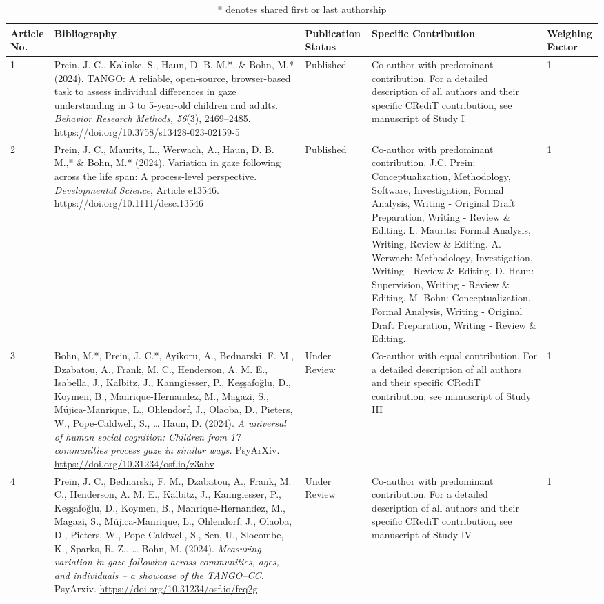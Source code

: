 \documentclass[
]{scrbook}
\begin{document}
\begin{table}[H]
\centering
\footnotesize
\begin{tabular}{p{8mm}p{55mm}p{18mm}p{48mm}p{9mm}}\toprule
Article No. & Bibliography & Publication Status & Specific Contribution & Weighing Factor \\
\midrule
1 & Prein, J. C., Kalinke, S., Haun, D. B. M.*, \& Bohn, M.* (2024). TANGO: A reliable, open-source, browser-based task to assess individual differences in gaze understanding in 3 to 5-year-old children and adults. \textit{Behavior Research Methods, 56}(3), 2469–2485. \url{https://doi.org/10.3758/s13428-023-02159-5} & Published & Co-author with predominant contribution. For a detailed description of all authors and their specific CRediT contribution, see manuscript of Study I & 1 \\
2 & Prein, J. C., Maurits, L., Werwach, A., Haun, D. B. M.,* \& Bohn, M.* (2024). Variation in gaze following across the life span: A process-level perspective. \textit{Developmental Science}, Article e13546. \url{https://doi.org/10.1111/desc.13546} & Published & Co-author with predominant contribution. J.C. Prein: Conceptualization, Methodology, Software, Investigation, Formal Analysis, Writing - Original Draft Preparation, Writing - Review \& Editing. L. Maurits: Formal Analysis, Writing, Review \& Editing. A. Werwach: Methodology, Investigation, Writing - Review \& Editing. D. Haun: Supervision, Writing - Review \& Editing. M. Bohn: Conceptualization, Formal Analysis, Writing - Original Draft Preparation, Writing - Review \& Editing. & 1 \\
3 & Bohn, M.*, Prein, J. C.*, Ayikoru, A., Bednarski, F. M., Dzabatou, A., Frank, M. C., Henderson, A. M. E., Isabella, J., Kalbitz, J., Kanngiesser, P., Keşşafoğlu, D., Koymen, B., Manrique-Hernandez, M., Magazi, S., Mújica-Manrique, L., Ohlendorf, J., Olaoba, D., Pieters, W., Pope-Caldwell, S., … Haun, D. (2024). \textit{A universal of human social cognition: Children from 17 communities process gaze in similar ways.} PsyArXiv. \url{https://doi.org/10.31234/osf.io/z3ahv} & Under Review & Co-author with equal contribution. For a detailed description of all authors and their specific CRediT contribution, see manuscript of Study III & 1 \\
4 & Prein, J. C., Bednarski, F. M., Dzabatou, A., Frank, M. C., Henderson, A. M. E., Kalbitz, J., Kanngiesser, P., Keşşafoğlu, D., Koymen, B., Manrique-Hernandez, M., Magazi, S., Mújica-Manrique, L., Ohlendorf, J., Olaoba, D., Pieters, W., Pope-Caldwell, S., Sen, U., Slocombe, K., Sparks, R. Z., … Bohn, M. (2024). \textit{Measuring variation in gaze following across communities, ages, and individuals – a showcase of the TANGO–CC.} PsyArxiv. \url{https://doi.org/10.31234/osf.io/fcq2g} & Under Review & Co-author with predominant contribution. For a detailed description of all authors and their specific CRediT contribution, see manuscript of Study IV & 1 \\
\bottomrule
\end{tabular}
\caption{\scriptsize{* denotes shared first or last authorship}}
\end{table}
\end{document}
